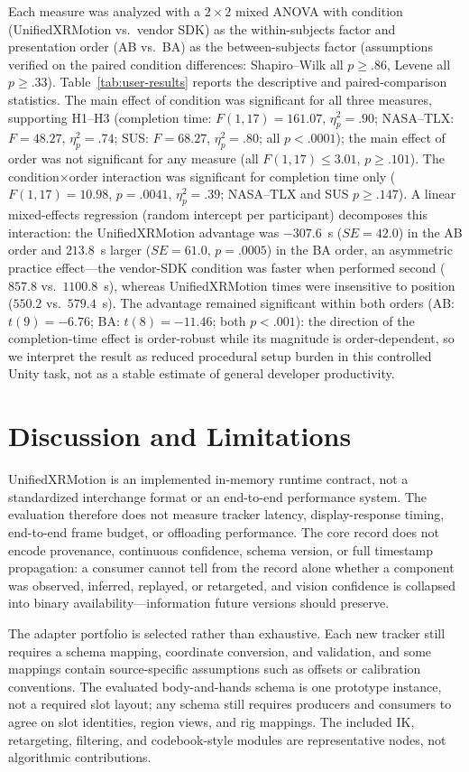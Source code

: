 \documentclass[runningheads]{llncs}
\begin{document}
Each measure was analyzed with a $2\times2$ mixed ANOVA with condition (UnifiedXRMotion vs.\ vendor SDK) as the within-subjects factor and presentation order (AB vs.\ BA) as the between-subjects factor (assumptions verified on the paired condition differences: Shapiro--Wilk all $p\ge.86$, Levene all $p\ge.33$). Table~\ref{tab:user-results} reports the descriptive and paired-comparison statistics. The main effect of condition was significant for all three measures, supporting H1--H3 (completion time: $F(1,17)=161.07$, $\eta_p^2=.90$; NASA--TLX: $F=48.27$, $\eta_p^2=.74$; SUS: $F=68.27$, $\eta_p^2=.80$; all $p<.0001$); the main effect of order was not significant for any measure (all $F(1,17)\le3.01$, $p\ge.101$). The condition$\times$order interaction was significant for completion time only ($F(1,17)=10.98$, $p=.0041$, $\eta_p^2=.39$; NASA--TLX and SUS $p\ge.147$). A linear mixed-effects regression (random intercept per participant) decomposes this interaction: the UnifiedXRMotion advantage was $-307.6$~s ($SE=42.0$) in the AB order and $213.8$~s larger ($SE=61.0$, $p=.0005$) in the BA order, an asymmetric practice effect---the vendor-SDK condition was faster when performed second ($857.8$ vs.\ $1100.8$~s), whereas UnifiedXRMotion times were insensitive to position ($550.2$ vs.\ $579.4$~s). The advantage remained significant within both orders (AB: $t(9)=-6.76$; BA: $t(8)=-11.46$; both $p<.001$): the direction of the completion-time effect is order-robust while its magnitude is order-dependent, so we interpret the result as reduced procedural setup burden in this controlled Unity task, not as a stable estimate of general developer productivity.


\section{Discussion and Limitations}\label{sec:discussion-limitations}
UnifiedXRMotion is an implemented in-memory runtime contract, not a standardized interchange format or an end-to-end performance system. The evaluation therefore does not measure tracker latency, display-response timing, end-to-end frame budget, or offloading performance. The core record does not encode provenance, continuous confidence, schema version, or full timestamp propagation: a consumer cannot tell from the record alone whether a component was observed, inferred, replayed, or retargeted, and vision confidence is collapsed into binary availability---information future versions should preserve.

The adapter portfolio is selected rather than exhaustive. Each new tracker still requires a schema mapping, coordinate conversion, and validation, and some mappings contain source-specific assumptions such as offsets or calibration conventions. The evaluated body-and-hands schema is one prototype instance, not a required slot layout; any schema still requires producers and consumers to agree on slot identities, region views, and rig mappings. The included IK, retargeting, filtering, and codebook-style modules are representative nodes, not algorithmic contributions.
\end{document}
